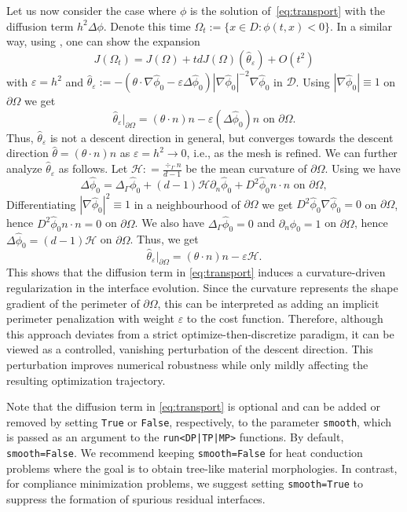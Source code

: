 \documentclass[preprint,9pt]{elsarticle}
\newcommand{\Om}{\Omega}
\begin{document}
{Let us now consider the case where  $\phi$ is the solution of~\eqref{eq:transport} with the diffusion term $h^2\Delta\phi$. 
Denote this time $\Om_t := \{x\in D : \phi(t,x) < 0\}$.
In a similar way,  using \cite[Theorem~3]{MR3840889}, one can show the expansion
$$J(\Om_t) = J(\Om) + t dJ(\Om)(\hat\theta_\varepsilon) + O(t^2) $$
with $\varepsilon =h^2$ and $\hat\theta_\varepsilon:= - (\theta\cdot\nabla \hat\phi_0 - \varepsilon\Delta\hat\phi_0) |\nabla \hat\phi_0|^{-2}\nabla \hat\phi_0$ in $\mathcal{D}$.
Using  $|\nabla \hat\phi_0| \equiv 1$ on $\partial\Om$ we get
$$\hat\theta_\varepsilon|_{\partial\Om} = (\theta\cdot n) n - \varepsilon  (\Delta\hat\phi_0) n \text{ on } \partial\Om.$$
Thus, $\hat\theta_\varepsilon$ is not a descent direction in general, but converges towards the descent direction $\hat\theta = (\theta\cdot n) n$
as $\varepsilon= h^2\to 0$, i.e., as the mesh is refined.
We can further analyze $\hat\theta_\varepsilon$ as follows. 
Let $\mathcal{H}: = \frac{\div_\Gamma n}{d-1}$ be the mean curvature of $\partial\Om$.
Using \cite[Proposition~5.4.12]{MR3791463} we have
$$ \Delta\hat\phi_0 = \Delta_\Gamma\hat\phi_0 + (d-1)\mathcal{H} \partial_n \hat\phi_0 +  D^2 \hat\phi_0 n\cdot n  \text{ on }\partial\Om,$$
Differentiating $|\nabla\hat\phi_0|^2 \equiv 1$ in a neighbourhood of $\partial\Om$ we get $D^2\hat\phi_0 \nabla \hat\phi_0 = 0$
on $\partial\Om$, hence $D^2 \hat\phi_0 n\cdot n = 0$ on $\partial\Om$.
We also have $\Delta_\Gamma\hat\phi_0=0$ and $\partial_n \hat\phi_0 =1$ on $\partial\Om$, hence $\Delta\hat\phi_0 =(d-1)\mathcal{H}$
on $\partial\Om$.
Thus, we get
$$\hat\theta_\varepsilon|_{\partial\Om} = (\theta\cdot n) n - \varepsilon  \mathcal{H}.$$
This shows that the diffusion term in \eqref{eq:transport} induces a
curvature-driven regularization in the interface evolution.
Since the curvature represents the shape gradient of the perimeter of $\partial\Om$, this can be interpreted as adding an implicit perimeter penalization with weight $\varepsilon$ to the cost function.
Therefore, although this approach deviates from a strict
optimize-then-discretize paradigm, it can be viewed as a controlled,
vanishing perturbation of the descent direction. This perturbation
improves numerical robustness while only mildly affecting the resulting optimization trajectory.


Note that the diffusion term in \eqref{eq:transport} is optional and can be added or removed
by setting \texttt{True} or \texttt{False}, respectively,
to the parameter \texttt{smooth},
which is passed as an argument to the \texttt{run<DP|TP|MP>} functions.
By default, \texttt{smooth=False}.
We recommend keeping \texttt{smooth=False} for heat conduction problems
where the goal is to obtain tree-like material morphologies.
In contrast, for compliance minimization problems,
we suggest setting \texttt{smooth=True} to suppress
the formation of spurious residual interfaces.
}
\end{document}
